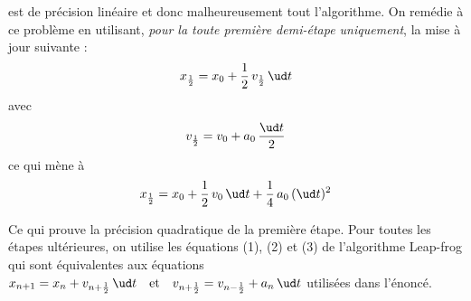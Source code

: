 est de précision linéaire et donc malheureusement tout l'algorithme. On remédie à ce problème en utilisant, \textit{pour la toute première demi-étape uniquement}, la mise à jour suivante : 
$$x_{\frac{1}{2}} = x_0 + \frac{1}{2}\,v_{\frac{1}{2}}\,\ud t$$ 
avec 
$$v_{\frac{1}{2}} = v_0 + a_0\,\frac{\ud t}{2}$$
ce qui mène à 
$$x_{\frac{1}{2}} = x_0 + \frac{1}{2}\,v_{0}\,\ud t + \frac{1}{4}\,a_0\,(\ud t)^2$$ 

Ce qui prouve la précision quadratique de la première étape. Pour toutes les étapes ultérieures, on utilise les équations (1), (2) et (3) de l'algorithme Leap-frog qui sont équivalentes aux équations $x_{n+1} = x_n + v_{n+\frac{1}{2}}\,\ud t \quad \textrm{et} \quad v_{n+\frac{1}{2}} = v_{n-\frac{1}{2}} + a_n\,\ud t$ utilisées dans l'énoncé.


